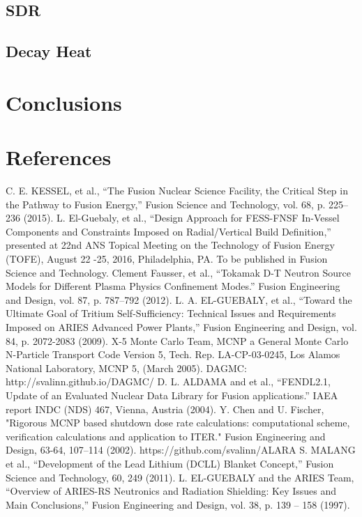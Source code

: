 \documentclass[12pt, letterpaper]{elsarticle}
\begin{document}
\subsection{SDR} \label{SDR}
\subsection{Decay Heat} \label{Decay Heat}

\section{Conclusions} \label{conclusion}

\newpage
\section{References}
\begin{thebibliography}{10} 
C. E. KESSEL, et al., {“The Fusion Nuclear Science Facility, the Critical Step in the Pathway to Fusion Energy,” Fusion Science and Technology, vol. 68, p. 225–236 (2015).}
L. El-Guebaly, et al., {“Design Approach for FESS-FNSF In-Vessel Components and Constraints Imposed on Radial/Vertical Build Definition,” presented at 22nd ANS Topical Meeting on the Technology of Fusion Energy (TOFE), August 22 -25, 2016, Philadelphia, PA. To be published in Fusion Science and Technology.}
Clement Fausser, et al., {“Tokamak D-T Neutron Source Models for Different Plasma Physics Confinement Modes.” Fusion Engineering and Design, vol. 87, p. 787–792 (2012).} 
L. A. EL-GUEBALY, et al., {“Toward the Ultimate Goal of Tritium Self-Sufficiency: Technical Issues and Requirements Imposed on ARIES Advanced Power Plants,” Fusion Engineering and Design, vol. 84, p. 2072-2083 (2009).}
X-5 Monte Carlo Team, {MCNP a General Monte Carlo N-Particle Transport Code Version 5, Tech. Rep. LA-CP-03-0245, Los Alamos National Laboratory, MCNP 5, (March 2005).}
{DAGMC: http://svalinn.github.io/DAGMC/}
D. L. ALDAMA and et al., {“FENDL2.1, Update of an Evaluated Nuclear Data Library for Fusion applications.” IAEA report INDC (NDS) 467, Vienna, Austria (2004).}
Y. Chen and U. Fischer, {"Rigorous MCNP based shutdown dose rate calculations: computational scheme, verification calculations and application to ITER." Fusion Engineering and Design, 63-64, 107–114 (2002).}
{https://github.com/svalinn/ALARA}
S. MALANG et al., {“Development of the Lead Lithium (DCLL) Blanket Concept,” Fusion Science and Technology, 60, 249 (2011).}
L. EL-GUEBALY and the ARIES Team, {“Overview of ARIES-RS Neutronics and Radiation Shielding: Key Issues and Main Conclusions,” Fusion Engineering and Design, vol. 38, p. 139 – 158 (1997).}
\end{thebibliography}
\end{document}
